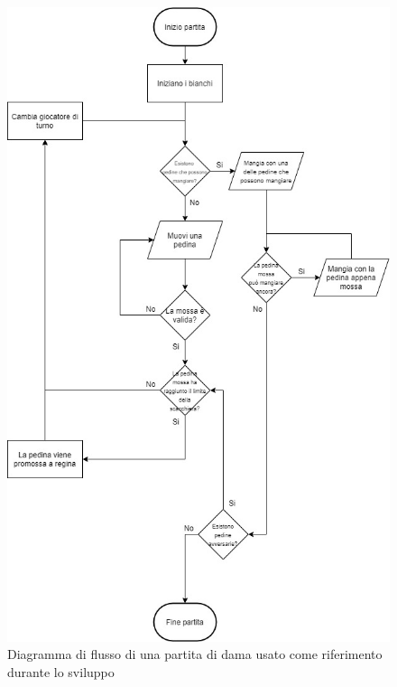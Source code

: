 \documentclass[12pt]{article}
\begin{document}
\begin{figure}[H]
\centering
\includegraphics[scale=.5]{GameFlowChart}
\caption{Diagramma di flusso di una partita di dama usato come riferimento durante lo sviluppo}
\label{img:GameFC}
\end{figure}
\end{document}

